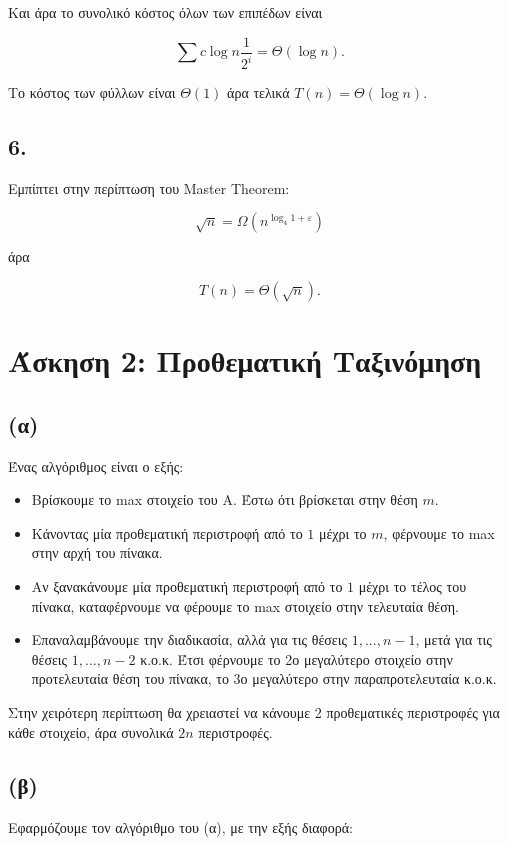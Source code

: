 			Και άρα το συνολικό κόστος όλων των επιπέδων είναι
			
			\[
				\sum c \log n \frac{1}{2^i} = Θ(\log n).
			\]
			
			Το κόστος των φύλλων είναι $Θ(1)$ άρα τελικά $T(n) = Θ(\log n)$.
		\subsection*{6.}
			Εμπίπτει στην περίπτωση του Master Theorem: 
			
			\[
				\sqrt n = Ω(n^{\log_4 1 + ε})
			\]
			
			άρα
			
			\[
				T(n) = Θ(\sqrt n).
			\]
		
	\section*{Άσκηση 2: Προθεματική Ταξινόμηση}
		\subsection*{(α)}
			Ένας αλγόριθμος είναι ο εξής: 
			
			\begin{itemize}
				\item Βρίσκουμε το max στοιχείο του A. Έστω ότι βρίσκεται στην θέση $m$.
				\item Κάνοντας μία προθεματική περιστροφή από το $1$ μέχρι το $m$, φέρνουμε το max στην αρχή του πίνακα.
				\item Αν ξανακάνουμε μία προθεματική περιστροφή από το $1$ μέχρι το τέλος του πίνακα, καταφέρνουμε να φέρουμε το max στοιχείο στην τελευταία θέση.
				\item Επαναλαμβάνουμε την διαδικασία, αλλά για τις θέσεις $1,...,n-1$, μετά για τις θέσεις $1,...,n-2$ κ.ο.κ. Έτσι φέρνουμε το 2ο μεγαλύτερο στοιχείο στην προτελευταία θέση του πίνακα, το 3ο μεγαλύτερο στην παραπροτελευταία κ.ο.κ.
			\end{itemize}
		
			Στην χειρότερη περίπτωση θα χρειαστεί να κάνουμε 2 προθεματικές περιστροφές για κάθε στοιχείο, άρα συνολικά $2n$ περιστροφές.
		
		\subsection*{(β)}
			Εφαρμόζουμε τον αλγόριθμο του (α), με την εξής διαφορά: \\
			
